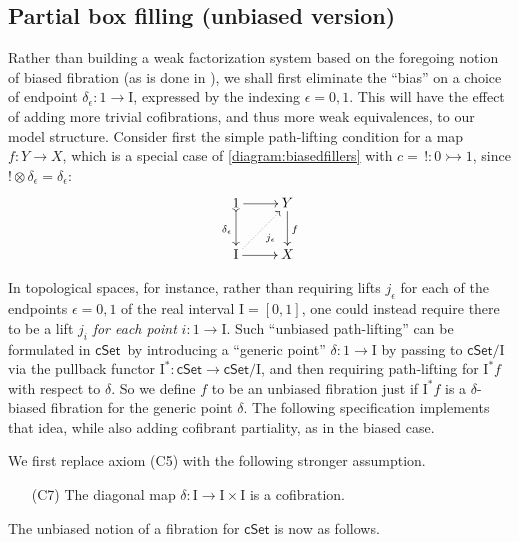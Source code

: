 \documentclass[12pt]{article}
\newcommand{\cSet}{\ensuremath{\mathsf{cSet}}}
\newcommand{\mono}{\ensuremath{\rightarrowtail}}
\newcommand{\ra}{\ensuremath{\rightarrow}}
\renewcommand{\to}{\ensuremath{\rightarrow}}
\newcommand{\I}{\ensuremath{\mathrm{I}}}
\theoremstyle{remark}
\theoremstyle{definition}
\begin{document}
\subsection{Partial box filling (unbiased version)}\label{subsec:unbiasedfibration}


Rather than building a weak factorization system based on the foregoing notion of biased fibration (as is done in \cite{GS}), we shall first eliminate the ``bias'' on a choice of endpoint $\delta_\epsilon : 1 \ra \I$, expressed by the indexing $\epsilon = 0,1$.  This will have the effect of adding more trivial cofibrations, and thus more weak equivalences, to our model structure. Consider first the simple path-lifting condition for a map $f : Y \to X$, which is a special case of \eqref{diagram:biasedfillers} with $c =\, ! : 0\mono 1$, since $!\otimes\delta_\epsilon = \delta_\epsilon$:
\begin{equation*}
\xymatrix{
1 \ar@{>->}[d]_{\delta_\epsilon} \ar[r] & Y \ar[d]^f \\
\I \ar@{.>}[ru]_{j_\epsilon} \ar[r] & X
}
\end{equation*}

In topological spaces, for instance, rather than requiring lifts $j_\epsilon$ for each of the endpoints $\epsilon = 0,1$  of the real interval $\I = [0,1]$, one could instead require there to be a lift $j_i$ \emph{for each point} $i: 1\ra\I$. Such ``unbiased path-lifting'' can be formulated in \cSet\ by introducing a ``generic point'' $\delta : 1\ra \I$ by passing to $\cSet/\I$ via the pullback functor $\I^* : \cSet\to \cSet/\I$, and then requiring path-lifting for $\I^*f$ with respect to $\delta$. So we define $f$ to be an unbiased fibration just if $\I^*f$ is a $\delta$-biased fibration for the generic point $\delta$.  The following specification implements that  idea, while also adding cofibrant partiality, as in the biased case.  

We first replace axiom (C5) with the following stronger assumption.
%
\begin{enumerate}
\item[(C7)] The diagonal map $\delta : \I\ra\I\times\I$ is a cofibration.  
\end{enumerate}

The unbiased notion of a fibration for $\cSet$ is now as follows.
\end{document}
